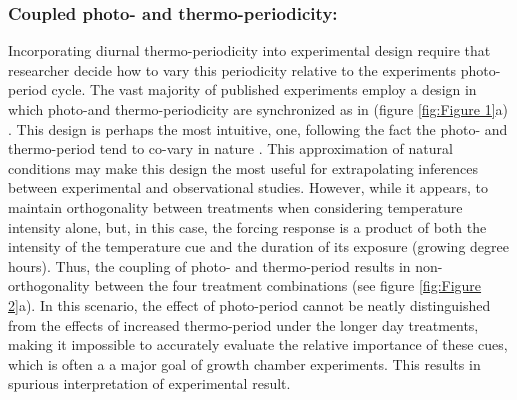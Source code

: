 \documentclass[12pt]{article}\usepackage[]{graphicx}\usepackage[]{color}
\begin{document}
\subsubsection*{Coupled photo- and thermo-periodicity:}
\indent\indent Incorporating diurnal thermo-periodicity into experimental design require that researcher decide how to vary this periodicity relative to the experiments photo-period cycle. The vast majority of published experiments employ a design in which photo-and thermo-periodicity are synchronized as in (figure \ref{fig:Figure 1}a) \citep{Ettinger_inprep}. This design is perhaps the most intuitive, one,  following the fact the photo- and thermo-period tend to co-vary in nature \citep{findcitations}. This approximation of natural conditions may make this design the most useful for extrapolating inferences between experimental and observational studies. However, while it appears, to maintain orthogonality between treatments when considering temperature intensity alone, but, in this case, the forcing response is a product of both the intensity of the temperature cue and the duration of its exposure (growing degree hours).  Thus, the coupling of photo- and thermo-period results in non-orthogonality between the four treatment combinations (see figure \ref{fig:Figure 2}a). In this scenario, the effect of photo-period cannot be neatly distinguished from the effects of increased thermo-period under the longer day treatments, making it impossible to accurately evaluate the relative importance of these cues, which is often a a major goal of growth chamber experiments. This results in spurious interpretation of experimental result.
\end{document}
